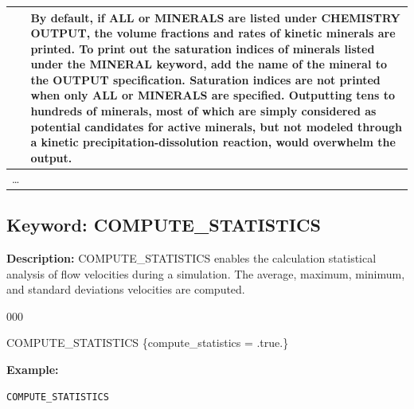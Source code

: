 \begin{center}
\begin{tabularx}{\linewidth}{lX}
& 
By default, if ALL or MINERALS are listed under CHEMISTRY OUTPUT, the volume fractions and rates of kinetic minerals are printed.  To print out the saturation indices of minerals listed under the MINERAL keyword, add the name of the mineral to the OUTPUT specification.  
Saturation indices are not printed when only ALL or MINERALS are specified. Outputting tens to hundreds of minerals, most of which are simply considered as potential candidates for active minerals, but not modeled through a kinetic precipitation-dissolution reaction, would overwhelm the output. \\
\midrule
\ldots & \\
\bottomrule
\end{tabularx}
\end{center}

\bigskip

\hyperlink{target_key}{\return}


\newpage
\protect\hypertarget{target_stat}{}


\subsection{Keyword: COMPUTE\_STATISTICS}

\noindent
{\bf Description:}
COMPUTE\_STATISTICS enables the calculation statistical analysis of flow velocities during a simulation.  The average, maximum, minimum, and standard deviations velocities are computed.

\hfill\hyperlink{target_key}{\return}

\begin{deflist}{000}
\item [COMPUTE\_STATISTICS] \{compute\_statistics = .true.\}
\end{deflist}


\begin{mdframed}

\noindent
{\bf Example:}
\footnotesize
\begin{verbatim}
COMPUTE_STATISTICS
\end{verbatim}
\normalsize
\end{mdframed}

\hyperlink{target_key}{\return}

